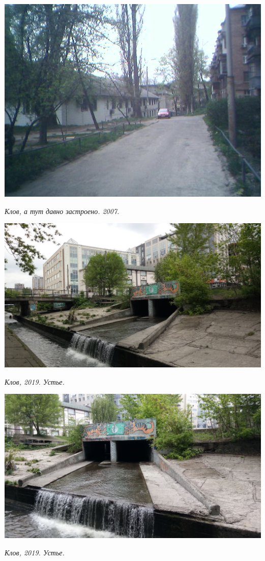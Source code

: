 \begin{center}
\includegraphics[width=\linewidth]{rpix/25-04-07_1553.jpg}

\textit{Клов, а тут давно застроено. 2007.}
\end{center}


\newpage
\vspace*{\fill}


\begin{center}
\includegraphics[width=\linewidth]{rpix/IMG_20190504_133527.jpg}

\textit{Клов, 2019. Устье.}
\end{center}

\begin{center}
\includegraphics[width=\linewidth]{rpix/IMG_20190504_133538.jpg}

\textit{Клов, 2019. Устье.}
\end{center}


